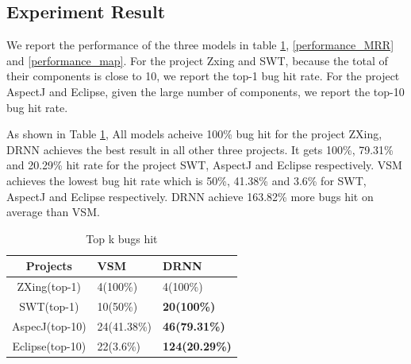\subsection{Experiment Result}

We report the performance of the three models in table \ref{performance_top_k}, \ref{performance_MRR} and \ref{performance_map}.
For the project Zxing and SWT, because the total of  their components is close to 10, we report the top-1 bug hit rate.
For the project AspectJ and Eclipse, given the large  number of components, we report the top-10 bug hit rate.

As shown in Table \ref{performance_top_k}, All models acheive 100\%  bug hit for the project ZXing, DRNN achieves the best result in all other three projects. It gets 100\%, 79.31\% and 20.29\% hit rate for the project SWT, AspectJ and Eclipse respectively. 
VSM achieves the lowest bug hit rate which is 50\%, 41.38\% and 3.6\% for SWT, AspectJ and Eclipse respectively. 
DRNN achieve 163.82\% more bugs hit on average than VSM.

 \begin{table}[h]
 	\begin{center}
 		\caption{Top k bugs hit}
 		\label{performance_top_k}
 		
 		\begin{tabular}{c|l|l} %
 			 \textbf{Projects} & \textbf{VSM} & \textbf{DRNN}\\
 			\hline\hline
 			ZXing(top-1)& 4(100\%)&4(100\%)  \\
 			
 			SWT(top-1) & 10(50\%) & \textbf{20(100\%)} \\
 			
 			AspecJ(top-10) & 24(41.38\%)  & \textbf{46(79.31\%)} \\
 			
 			Eclipse(top-10) &22(3.6\%) & \textbf{124(20.29\%)} \\
 			
 		\end{tabular}
 	\end{center}
 \end{table}
 
%  		
%  			
%  			
%  			
%  			

